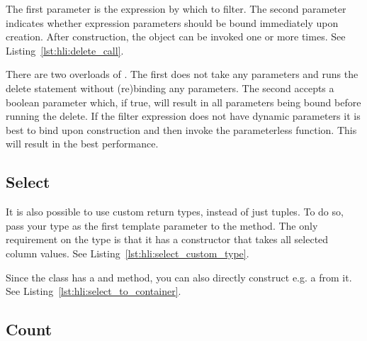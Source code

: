 

The first parameter is the expression by which to filter. The second parameter indicates whether expression parameters should be bound immediately upon creation. After construction, the object can be invoked one or more times. See Listing~\ref{lst:hli:delete_call}.



There are two overloads of . The first does not take any parameters and runs the delete statement without (re)binding any parameters. The second accepts a boolean parameter which, if true, will result in all parameters being bound before running the delete. If the filter expression does not have dynamic parameters it is best to bind upon construction and then invoke the parameterless function. This will result in the best performance.

\subsection{Select}
\label{section:hli:select}


It is also possible to use custom return types, instead of just tuples. To do so, pass your type as the first template parameter to the  method. The only requirement on the type is that it has a constructor that takes all selected column values. See Listing~\ref{lst:hli:select_custom_type}.



Since the  class has a  and  method, you can also directly construct e.g. a  from it. See Listing~\ref{lst:hli:select_to_container}.




\subsection{Count}
\label{section:hli:count}
